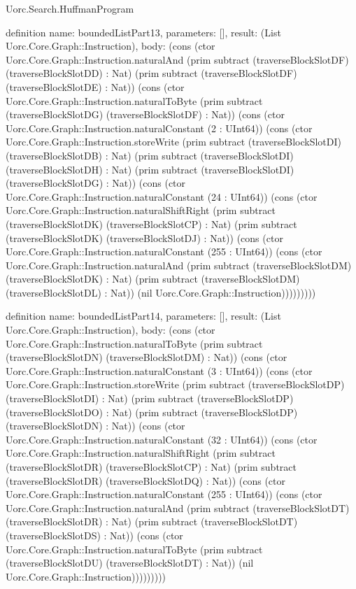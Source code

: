\begin{lexlean}{Uorc.Search.HuffmanProgram}
\begin{semanticmodule}
definition{
  name: boundedListPart13,
  parameters: [],
  result: (List Uorc.Core.Graph::Instruction),
  body: (cons (ctor Uorc.Core.Graph::Instruction.naturalAnd (prim subtract (traverseBlockSlotDF) (traverseBlockSlotDD) : Nat) (prim subtract (traverseBlockSlotDF) (traverseBlockSlotDE) : Nat)) (cons (ctor Uorc.Core.Graph::Instruction.naturalToByte (prim subtract (traverseBlockSlotDG) (traverseBlockSlotDF) : Nat)) (cons (ctor Uorc.Core.Graph::Instruction.naturalConstant (2 : UInt64)) (cons (ctor Uorc.Core.Graph::Instruction.storeWrite (prim subtract (traverseBlockSlotDI) (traverseBlockSlotDB) : Nat) (prim subtract (traverseBlockSlotDI) (traverseBlockSlotDH) : Nat) (prim subtract (traverseBlockSlotDI) (traverseBlockSlotDG) : Nat)) (cons (ctor Uorc.Core.Graph::Instruction.naturalConstant (24 : UInt64)) (cons (ctor Uorc.Core.Graph::Instruction.naturalShiftRight (prim subtract (traverseBlockSlotDK) (traverseBlockSlotCP) : Nat) (prim subtract (traverseBlockSlotDK) (traverseBlockSlotDJ) : Nat)) (cons (ctor Uorc.Core.Graph::Instruction.naturalConstant (255 : UInt64)) (cons (ctor Uorc.Core.Graph::Instruction.naturalAnd (prim subtract (traverseBlockSlotDM) (traverseBlockSlotDK) : Nat) (prim subtract (traverseBlockSlotDM) (traverseBlockSlotDL) : Nat)) (nil Uorc.Core.Graph::Instruction)))))))))
}

definition{
  name: boundedListPart14,
  parameters: [],
  result: (List Uorc.Core.Graph::Instruction),
  body: (cons (ctor Uorc.Core.Graph::Instruction.naturalToByte (prim subtract (traverseBlockSlotDN) (traverseBlockSlotDM) : Nat)) (cons (ctor Uorc.Core.Graph::Instruction.naturalConstant (3 : UInt64)) (cons (ctor Uorc.Core.Graph::Instruction.storeWrite (prim subtract (traverseBlockSlotDP) (traverseBlockSlotDI) : Nat) (prim subtract (traverseBlockSlotDP) (traverseBlockSlotDO) : Nat) (prim subtract (traverseBlockSlotDP) (traverseBlockSlotDN) : Nat)) (cons (ctor Uorc.Core.Graph::Instruction.naturalConstant (32 : UInt64)) (cons (ctor Uorc.Core.Graph::Instruction.naturalShiftRight (prim subtract (traverseBlockSlotDR) (traverseBlockSlotCP) : Nat) (prim subtract (traverseBlockSlotDR) (traverseBlockSlotDQ) : Nat)) (cons (ctor Uorc.Core.Graph::Instruction.naturalConstant (255 : UInt64)) (cons (ctor Uorc.Core.Graph::Instruction.naturalAnd (prim subtract (traverseBlockSlotDT) (traverseBlockSlotDR) : Nat) (prim subtract (traverseBlockSlotDT) (traverseBlockSlotDS) : Nat)) (cons (ctor Uorc.Core.Graph::Instruction.naturalToByte (prim subtract (traverseBlockSlotDU) (traverseBlockSlotDT) : Nat)) (nil Uorc.Core.Graph::Instruction)))))))))
}


\end{semanticmodule}
\end{lexlean}
